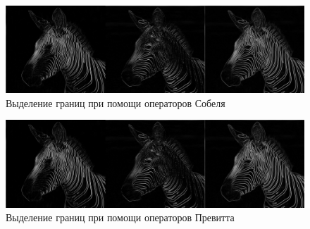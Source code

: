 \begin{figure}[H]
	\begin{center}
		\includegraphics[scale=0.2]{Sobel_all_2.jpg}
		\caption{Выделение границ при помощи операторов Собеля} 
		\label{pic:hist_orig} %
	\end{center}
\end{figure}
\begin{figure}[H]
	\begin{center}
		\includegraphics[scale=0.2]{prewit_all_2.jpg}
		\caption{Выделение границ при помощи операторов Превитта} 
		\label{pic:hist_orig} %
	\end{center}
\end{figure}



